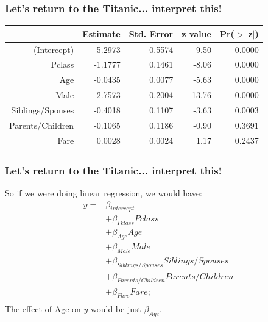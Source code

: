 \documentclass[aspectratio=169]{beamer}
\begin{document}
\begin{frame}
\frametitle{Let's return to the Titanic... interpret this!}

\begin{table}[ht]
\centering
\begin{tabular}{rrrrr}
  \hline
   \hline
 & Estimate & Std. Error & z value & Pr($>$$|$z$|$) \\ 
  \hline
    \hline
(Intercept) & 5.2973 & 0.5574 & 9.50 & 0.0000 \\ 
  Pclass & -1.1777 & 0.1461 & -8.06 & 0.0000 \\ 
  Age & -0.0435 & 0.0077 & -5.63 & 0.0000 \\ 
  Male & -2.7573 & 0.2004 & -13.76 & 0.0000 \\ 
  Siblings/Spouses & -0.4018 & 0.1107 & -3.63 & 0.0003 \\ 
  Parents/Children & -0.1065 & 0.1186 & -0.90 & 0.3691 \\ 
  Fare & 0.0028 & 0.0024 & 1.17 & 0.2437 \\ 
   \hline
     \hline
\end{tabular}
\end{table}

\end{frame}

\begin{frame}
\frametitle{Let's return to the Titanic... interpret this!}

So if we were doing linear regression, we would have:
\begin{align*}
y = &\beta_{intercept}\\
 &+ \beta_{Pclass}Pclass\\
 &+ \beta_{Age}Age\\ 
 &+ \beta_{Male}Male\\ 
 &+ \beta_{Siblings/Spouses}Siblings/Spouses\\
 &+ \beta_{Parents/Children}Parents/Children\\
 &+ \beta_{Fare}Fare;\\
\end{align*}
\bigskip
\bigskip
{}The effect of Age on $y$ would be just $\beta_{Age}$.
\end{frame}
\end{document}
